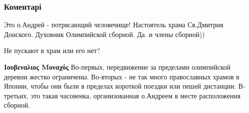  
 
 
 
 
\subsubsection{Коментарі}

\begin{itemize}
 
Это о.Андрей - потрясающий человечище! Настоятель храма Св.Дмитрия Донского. Духовник Олимпийской сборной.
Да. и члены сборной))

 
Не пускают в храм или его нет?

\begin{itemize}
 
\textbf{Ιουβεναλιος Μοναχός} Во-первых, передвижение за пределами олимпийской
деревни жестко ограничены. Во-вторых - не так много православных храмов в
Японии, чтобы они были в пределах короткой поездки или пешей дистанции.
В-третьих, это такая часовенка, организованная о.Андреем в месте расположения
сборной.
\end{itemize}

 

\end{itemize}
